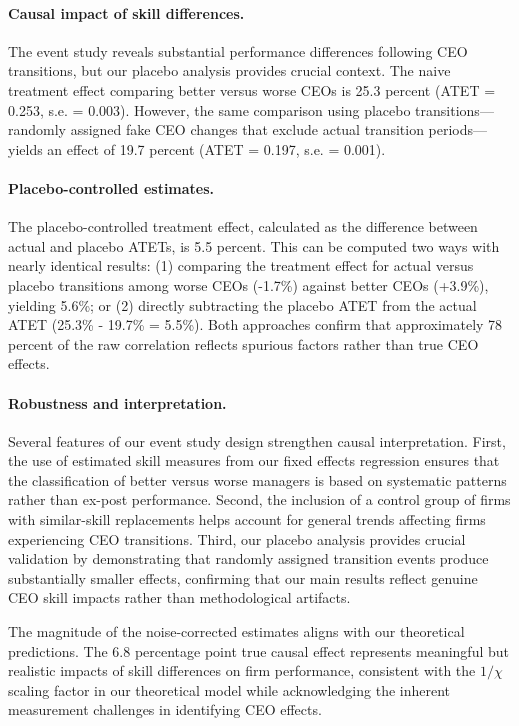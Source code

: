 \documentclass[11pt,a4paper]{article}
\begin{document}
\paragraph{Causal impact of skill differences.} The event study reveals substantial performance differences following CEO transitions, but our placebo analysis provides crucial context. The naive treatment effect comparing better versus worse CEOs is 25.3 percent (ATET = 0.253, s.e. = 0.003). However, the same comparison using placebo transitions---randomly assigned fake CEO changes that exclude actual transition periods---yields an effect of 19.7 percent (ATET = 0.197, s.e. = 0.001).

\paragraph{Placebo-controlled estimates.} The placebo-controlled treatment effect, calculated as the difference between actual and placebo ATETs, is 5.5 percent. This can be computed two ways with nearly identical results: (1) comparing the treatment effect for actual versus placebo transitions among worse CEOs (-1.7\%) against better CEOs (+3.9\%), yielding 5.6\%; or (2) directly subtracting the placebo ATET from the actual ATET (25.3\% - 19.7\% = 5.5\%). Both approaches confirm that approximately 78 percent of the raw correlation reflects spurious factors rather than true CEO effects.

\paragraph{Robustness and interpretation.} Several features of our event study design strengthen causal interpretation. First, the use of estimated skill measures from our fixed effects regression ensures that the classification of better versus worse managers is based on systematic patterns rather than ex-post performance. Second, the inclusion of a control group of firms with similar-skill replacements helps account for general trends affecting firms experiencing CEO transitions. Third, our placebo analysis provides crucial validation by demonstrating that randomly assigned transition events produce substantially smaller effects, confirming that our main results reflect genuine CEO skill impacts rather than methodological artifacts.

The magnitude of the noise-corrected estimates aligns with our theoretical predictions. The 6.8 percentage point true causal effect represents meaningful but realistic impacts of skill differences on firm performance, consistent with the $1/\chi$ scaling factor in our theoretical model while acknowledging the inherent measurement challenges in identifying CEO effects.
\end{document}
